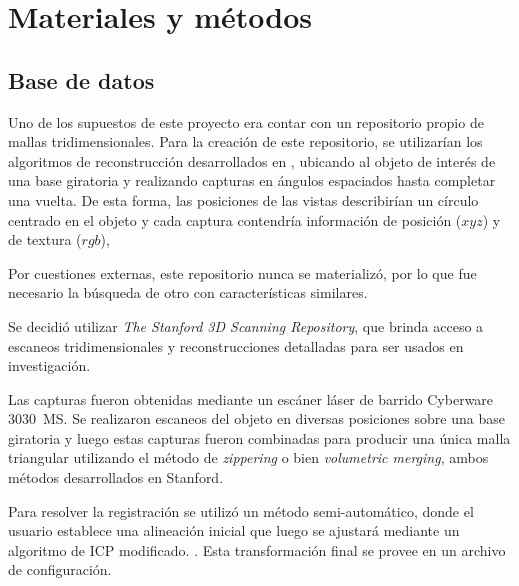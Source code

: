 \chapter{Materiales y métodos}

\section{Base de datos}
Uno de los supuestos de este proyecto era contar con un repositorio propio de
mallas tridimensionales.
Para la creación de este repositorio,
se utilizarían los algoritmos de reconstrucción desarrollados en ,
ubicando al objeto de interés de una base giratoria y realizando capturas 
en ángulos espaciados hasta completar una vuelta.
De esta forma, las posiciones de las vistas describirían un círculo centrado en el objeto y
cada captura contendría información de posición ($xyz$) y de textura ($rgb$), 

Por cuestiones externas, este repositorio nunca se materializó, por lo que fue necesario
la búsqueda de otro con características similares.


Se decidió utilizar \emph{The Stanford 3D Scanning Repository}, que brinda
acceso a escaneos tridimensionales y reconstrucciones detalladas para ser
usados en investigación.

Las capturas fueron obtenidas mediante un escáner láser de barrido Cyberware
3030~MS.  Se realizaron escaneos del objeto en diversas posiciones sobre una
base giratoria y luego estas capturas fueron combinadas para producir una única
malla triangular utilizando el método de \emph{zippering} o bien
\emph{volumetric merging}, ambos métodos desarrollados en
Stanford.

Para resolver la registración se utilizó un método semi-automático,
donde el usuario establece una alineación inicial que luego se ajustará mediante un algoritmo
de ICP modificado.  .
Esta transformación final se provee en un archivo de configuración.

